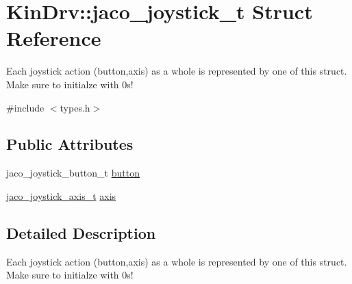 \hypertarget{structKinDrv_1_1jaco__joystick__t}{\section{Kin\+Drv\+:\+:jaco\+\_\+joystick\+\_\+t Struct Reference}
\label{structKinDrv_1_1jaco__joystick__t}
}


Each joystick action (button,axis) as a whole is represented by one of this struct. Make sure to initialze with 0s!  




{\ttfamily \#include $<$types.\+h$>$}

\subsection*{Public Attributes}
\begin{DoxyCompactItemize}
\item 
jaco\+\_\+joystick\+\_\+button\+\_\+t \hyperlink{structKinDrv_1_1jaco__joystick__t_af1a7ba692bcd9b198dd70d962249ada0}{button}
\item 
\hyperlink{structKinDrv_1_1jaco__joystick__axis__t}{jaco\+\_\+joystick\+\_\+axis\+\_\+t} \hyperlink{structKinDrv_1_1jaco__joystick__t_a09ee2ead312e8ac5b4e9318a218d15eb}{axis}
\end{DoxyCompactItemize}


\subsection{Detailed Description}
Each joystick action (button,axis) as a whole is represented by one of this struct. Make sure to initialze with 0s! 


